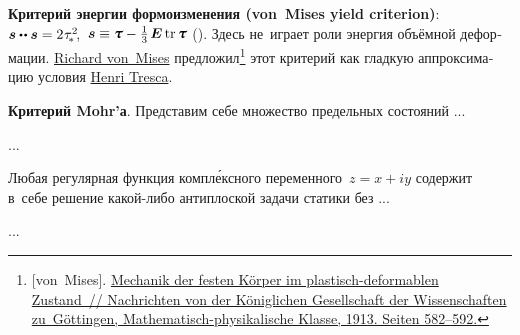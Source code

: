 \begin{otherlanguage}{russian}
\textbf{Критерий энергии формоизменения (von~Mises yield criterion)}: ${\stressdeviator \dotdotp \stressdeviator = 2 \hspace{.12ex} \tau_{\!*}^2\hspace{-0.5ex}}$, ${\, \stressdeviator \equiv \mathboldtau - \frac{1}{3} \hspace{.25ex} \bm{E} \operatorname{tr} \mathboldtau}$ (). Здесь не~играет роли энергия объёмной деформации.
\href{https://en.wikipedia.org/wiki/Richard_von_Mises}{Richard von~Mises} предложил\footnote{[von~Mises]. \href{https://gdz.sub.uni-goettingen.de/id/PPN252457811_1913?tify=\%7B"pages":\%5B602\%5D,"view":"info"\%7D}{Mechanik der festen K\"{o}rper im plastisch-deformablen Zustand~// Nachrichten von der K\"{o}niglichen Gesellschaft der Wissenschaften zu~Göttingen, Mathematisch-physikalische Klasse, 1913. Seiten 582\hbox{--}592.}}\hspace{-0.25ex}
этот критерий как гладкую аппроксимацию условия \href{https://en.wikipedia.org/wiki/Henri_Tresca}{Henri Tresca}.

\textbf{Критерий Mohr’а}. Представим себе множество предельных состояний ...

...



\end{otherlanguage}



\begin{otherlanguage}{russian}

Любая регулярная функция компл\'{е}ксного переменного~${z = x + iy}$ содержит в~себе решение какой\hbox{-}либо антиплоской задачи статики без ...

...



\end{otherlanguage}


